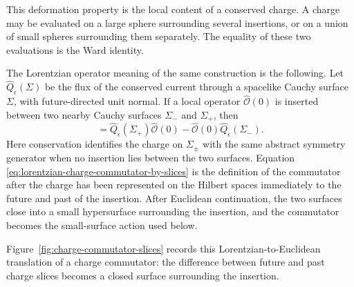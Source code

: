 This deformation property is the local content of a conserved charge.  A
charge may be evaluated on a large sphere surrounding several insertions, or
on a union of small spheres surrounding them separately.  The equality of
these two evaluations is the Ward identity.

\begin{definition}
\label{def:lorentzian-charge-commutator-across-insertion}
The Lorentzian operator meaning of the same construction is the following.
Let \(\widehat Q_\epsilon(\Sigma)\) be the flux of the conserved current
through a spacelike Cauchy surface \(\Sigma\), with future-directed unit normal.
If a local operator \(\widehat{\mathcal O}(0)\) is inserted between two nearby
Cauchy surfaces \(\Sigma_-\) and \(\Sigma_+\), then
\begin{equation}
  [\widehat Q_\epsilon,\widehat{\mathcal O}(0)]
  =
  \widehat Q_\epsilon(\Sigma_+)\widehat{\mathcal O}(0)
  -
  \widehat{\mathcal O}(0)\widehat Q_\epsilon(\Sigma_-).
  \label{eq:lorentzian-charge-commutator-by-slices}
\end{equation}
Here conservation identifies the charge on \(\Sigma_\pm\) with the same
abstract symmetry generator when no insertion lies between the two surfaces.
Equation \eqref{eq:lorentzian-charge-commutator-by-slices} is the definition
of the commutator after the charge has been represented on the Hilbert spaces
immediately to the future and past of the insertion.  After Euclidean
continuation, the two surfaces close into a small hypersurface surrounding the
insertion, and the commutator becomes the small-surface action used below.
\end{definition}

Figure~\ref{fig:charge-commutator-slices} records this Lorentzian-to-Euclidean
translation of a charge commutator: the difference between future and past
charge slices becomes a closed surface surrounding the insertion.

